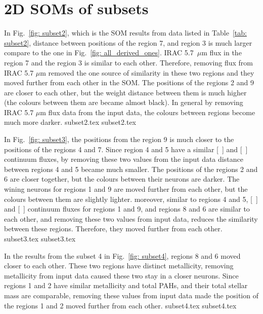 \newpage
\appendix
\section{2D SOMs of subsets}

        In Fig.~\ref{fig: subset2}, which is the SOM results from data listed in Table~\ref{tab: subset2}, distance between positions of the region 7, and region 3 is much larger compare to the one in Fig.~\ref{fig: all_derived_ones}. 
        IRAC 5.7~$\mu$m flux in the region 7 and the region 3 is similar to each other. 
        Therefore, removing flux from IRAC 5.7 $\mu$m removed the one source of similarity in these two regions and they moved further from each other in the SOM.
        The positions of the regions 2 and 9 are closer to each other, but the weight distance between them is much higher (the colours between them are became almost black). 
        In general by removing IRAC 5.7 $\mu$m  flux data from the input data, the colours between regions become much more darker.
        {subset2.tex}
        {subset2.tex}
        
        In Fig.~\ref{fig: subset3}, the positions from the region 9 is much closer to the positions of the regions 4 and 7. 
        Since region 4 and 5 have a similar [~\oiii] and [~\sii] continuum fluxes, by removing these two values from the input data distance between regions 4 and 5 became much smaller.
        The positions of the regions 2 and 6 are closer together, but the colours between their neurons are darker.
        The wining neurons for regions 1 and 9 are moved further from each other, but the colours between them are slightly lighter. 
        moreover, similar to regions 4 and 5, [~\oiii] and [~\sii] continuum fluxes for regions 1 and 9, and regions 8 and 6 are similar to each other, and removing these two values from input data, reduces the similarity between these regions. Therefore, they moved further from each other. 
        {subset3.tex}
        {subset3.tex}
        
        In the results from the subset 4 in Fig.~\ref{fig: subset4}, regions 8 and 6 moved closer to each other. 
        These two regions have distinct metallicity, removing metallicity from input data caused these two stay in a closer neurons. 
        Since regions 1 and 2 have similar metallicity and total PAHs, and their total stellar mass are comparable, removing these values from input data made the position of the regions 1 and 2 moved further from each other. 
        {subset4.tex}
        {subset4.tex}
        
